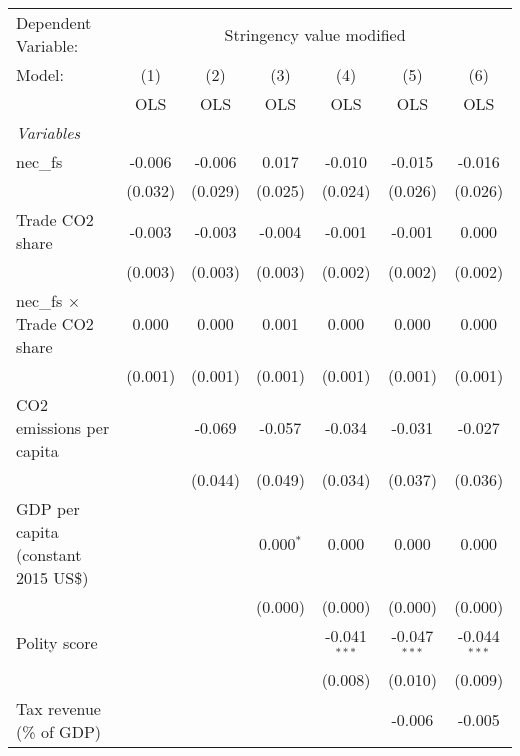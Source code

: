 
\begingroup
\centering
\begin{tabular}{lcccccc}
   \toprule
   Dependent Variable: & \multicolumn{6}{c}{Stringency value modified}\\
   Model:                               & (1)     & (2)     & (3)         & (4)            & (5)            & (6)\\  
                                        &  OLS    & OLS     & OLS         & OLS            & OLS            & OLS\\  
   \midrule
   \emph{Variables}\\
   nec\_fs                              & -0.006  & -0.006  & 0.017       & -0.010         & -0.015         & -0.016\\   
                                        & (0.032) & (0.029) & (0.025)     & (0.024)        & (0.026)        & (0.026)\\   
   Trade CO2 share                      & -0.003  & -0.003  & -0.004      & -0.001         & -0.001         & 0.000\\   
                                        & (0.003) & (0.003) & (0.003)     & (0.002)        & (0.002)        & (0.002)\\   
   nec\_fs $\times$ Trade CO2 share     & 0.000   & 0.000   & 0.001       & 0.000          & 0.000          & 0.000\\   
                                        & (0.001) & (0.001) & (0.001)     & (0.001)        & (0.001)        & (0.001)\\   
   CO2 emissions per capita             &         & -0.069  & -0.057      & -0.034         & -0.031         & -0.027\\   
                                        &         & (0.044) & (0.049)     & (0.034)        & (0.037)        & (0.036)\\   
   GDP per capita (constant 2015 US\$)  &         &         & 0.000$^{*}$ & 0.000          & 0.000          & 0.000\\   
                                        &         &         & (0.000)     & (0.000)        & (0.000)        & (0.000)\\   
   Polity score                         &         &         &             & -0.041$^{***}$ & -0.047$^{***}$ & -0.044$^{***}$\\   
                                        &         &         &             & (0.008)        & (0.010)        & (0.009)\\   
   Tax revenue (\% of GDP)              &         &         &             &                & -0.006         & -0.005\\   

\end{tabular}
